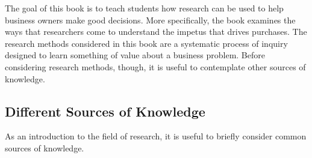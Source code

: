 \documentclass[]{book}
\theoremstyle{definition}
\theoremstyle{definition}
\theoremstyle{definition}
\theoremstyle{remark}
\begin{document}
The goal of this book is to teach students how research can be used to
help business owners make good decisions. More specifically, the book
examines the ways that researchers come to understand the impetus that
drives purchases. The research methods considered in this book are a
systematic process of inquiry designed to learn something of value about
a business problem. Before considering research methods, though, it is
useful to contemplate other sources of knowledge.

\hypertarget{different-sources-of-knowledge}{%
\subsection{Different Sources of
Knowledge}\label{different-sources-of-knowledge}}

As an introduction to the field of research, it is useful to briefly
consider common sources of knowledge.
\end{document}
